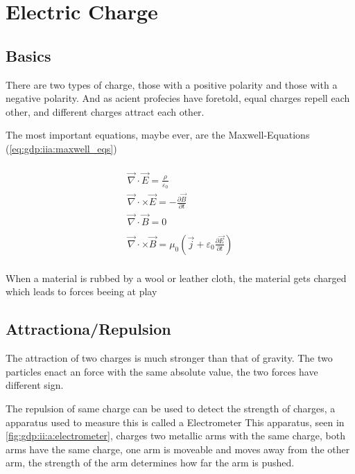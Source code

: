 \section{Electric Charge}

\subsection{Basics}

There are two types of charge,
    those with a positive polarity and
    those with a negative polarity.
And as acient profecies have foretold, equal charges repell each other,
    and different charges attract each other.

The most important equations, maybe ever, are the Maxwell-Equations 
    (\ref{eq:gdp:iia:maxwell_eqs})

\begin{multline} \label{eq:gdp:iia:maxwell_eqs}\\
\vec{\nabla}\cdot \vec{E} = \frac{\rho}{\varepsilon_0}\\
\vec{\nabla}\cdot \times \vec{E} = -\frac{\partial \vec{B}}{\partial t}\\
\vec{\nabla}\cdot \vec{B} = 0 \\
\\
\vec{\nabla}\cdot \times \vec{B} =
    \mu_0 \left( \vec{j} + \varepsilon_0 \frac{\partial \vec{E}}{\partial t} \right)\\
\end{multline}

When a material is rubbed by a wool or leather cloth,
    the material gets charged which leads to forces beeing at play

\subsection{Attractiona/Repulsion}

The attraction of two charges is much stronger than that of gravity.
The two particles enact an force with the same absolute value,
    the two forces have different sign.


The repulsion of same charge can be used to detect the strength of charges,
    a apparatus used to measure this is called a Electrometer
This apparatus, seen in \ref{fig:gdp:ii:a:electrometer}, charges two metallic arms with the same charge,
    both arms have the same charge,
    one arm is moveable and moves away from the other arm,
    the strength of the arm determines how far the arm is pushed.

